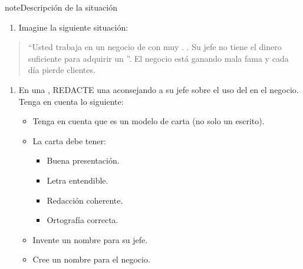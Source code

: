 \documentclass[letterpaper,10pt,spanish]{sphinxmanual}
\begin{document}
\begin{sphinxadmonition}{note}{Descripción de la situación}
\begin{enumerate}
%
\item {} 
\sphinxAtStartPar
Imagine la siguiente situación:

\end{enumerate}
\begin{quote}

\sphinxAtStartPar
“Usted trabaja en un negocio de  con muy . . Su jefe no tiene el dinero suficiente para adquirir un ”. El negocio está ganando mala fama y cada día pierde clientes.
\end{quote}
\begin{enumerate}
%
\setcounter{enumi}{1}
\item {} 
\sphinxAtStartPar
En una , REDACTE una  aconsejando a su jefe sobre el uso del  en el negocio. Tenga en cuenta lo siguiente:
\begin{itemize}
\item {} 
\sphinxAtStartPar
Tenga en cuenta que es un modelo de carta (no solo un escrito).

\item {} 
\sphinxAtStartPar
La carta debe tener:
\begin{itemize}
\item {} 
\sphinxAtStartPar
Buena presentación.

\item {} 
\sphinxAtStartPar
Letra entendible.

\item {} 
\sphinxAtStartPar
Redacción coherente.

\item {} 
\sphinxAtStartPar
Ortografía correcta.

\end{itemize}

\item {} 
\sphinxAtStartPar
Invente un nombre para su jefe.

\item {} 
\sphinxAtStartPar
Cree un nombre para el negocio.


\end{itemize}
\end{enumerate}
\end{sphinxadmonition}
\end{document}

